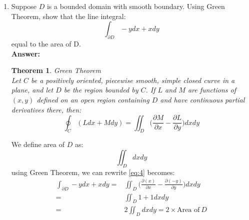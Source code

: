 \documentclass[a4paper,12pt]{article}
\newtheorem{theorem}{Theorem}
\begin{document}
\begin{enumerate}
	\newpage
	\item Suppose $D$ is a bounded domain with smooth boundary. Using Green Theorem, show that the line integral:
	\begin{equation}\label{eq:4}
	\int_{\partial D} -ydx + xdy
	\end{equation}
	equal to the area of D.\\
	\newline
	\textbf{Answer:}
	\begin{theorem} Green Theorem\\
		Let $C$ be a positively oriented, piecewise smooth, simple closed curve in a plane, and let $D$ be the region bounded by $C$. If $L$ and $M$ are functions of $(x,y)$ defined on an open region containing $D$ and have continuous partial derivatives there, then:
		\begin{equation*}
		\oint_C (L dx + M dy) = \iint_{D} \bigg( \frac{\partial M}{\partial x} - \frac{\partial L}{\partial y} \bigg) dx dy
		\end{equation*}
	\end{theorem}
	We define area of $D$ as:
	\begin{equation*}
	\iint_{D} dx dy
	\end{equation*}
	using Green Theorem, we can rewrite \eqref{eq:4} becomes:
	\begin{equation*}
	\begin{aligned}
	\int_{\partial D} -ydx + xdy =& \iint_{D} \bigg( \frac{\partial (x)}{\partial x} - \frac{\partial (-y)}{\partial y} \bigg) dx dy\\
	=& \iint_{D} 1 + 1 dx dy\\
	=& 2 \iint_{D} dx dy = 2\times \text{Area of}\ D
	\end{aligned}
	\end{equation*}
\end{enumerate}
\end{document}
